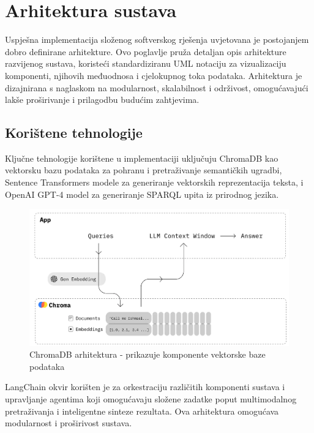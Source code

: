 \chapter{Arhitektura sustava}
\label{ch:system_architecture}

Uspješna implementacija složenog softverskog rješenja uvjetovana je postojanjem dobro definirane arhitekture. Ovo poglavlje pruža detaljan opis arhitekture razvijenog sustava, koristeći standardiziranu UML notaciju za vizualizaciju komponenti, njihovih međuodnosa i cjelokupnog toka podataka. Arhitektura je dizajnirana s naglaskom na modularnost, skalabilnost i održivost, omogućavajući lakše proširivanje i prilagodbu budućim zahtjevima.

\section{Korištene tehnologije}

Ključne tehnologije korištene u implementaciji uključuju ChromaDB kao vektorsku bazu podataka za pohranu i pretraživanje semantičkih ugradbi, Sentence Transformers modele za generiranje vektorskih reprezentacija teksta, i OpenAI GPT-4 model za generiranje SPARQL upita iz prirodnog jezika.

\begin{figure}[h!]
    \centering
    \includegraphics[width=1\textwidth]{figures/chroma.png}
    \caption{ChromaDB arhitektura - prikazuje komponente vektorske baze podataka}
    \label{fig:chromadb_architecture}
\end{figure}

LangChain okvir korišten je za orkestraciju različitih komponenti sustava i upravljanje agentima koji omogućavaju složene zadatke poput multimodalnog pretraživanja i inteligentne sinteze rezultata. Ova arhitektura omogućava modularnost i proširivost sustava.

